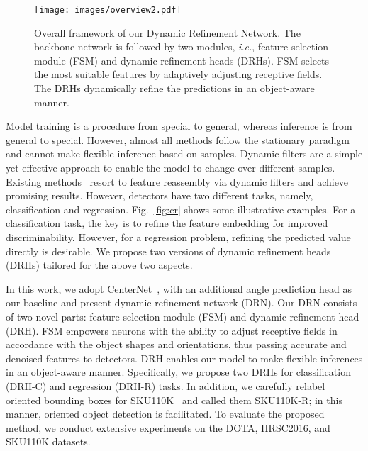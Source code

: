 \documentclass[10pt,twocolumn,letterpaper]{article}
\begin{document}
\begin{figure*}\centering
\texttt{[image: images/overview2.pdf]}
\vspace{-15pt}
\caption{Overall framework of our Dynamic Refinement Network. The backbone network is followed by two modules, \textit{i.e.}, feature selection module (FSM) and dynamic refinement heads (DRHs).
FSM selects the most suitable features by adaptively adjusting receptive fields.
The DRHs dynamically refine the predictions in an object-aware manner.}
\label{fig:overview}
\end{figure*}
 Model training is a procedure from special to general, whereas inference is from general to special.
However, almost all methods follow the stationary paradigm and cannot make flexible inference based on samples. Dynamic filters are a simple yet effective approach to enable the model to change over different samples.
Existing methods~\cite{dai2017deformable,wang2019carafe} resort to feature reassembly via dynamic filters and achieve promising results.
However, detectors have two different tasks, namely, classification and regression.
Fig.~\ref{fig:cr} shows some illustrative examples.
For a classification task, the key is to refine the feature embedding for improved discriminability.
However, for a regression problem, refining the predicted value directly is desirable.
We propose two versions of dynamic refinement heads (DRHs) tailored for the above two aspects.


In this work, we adopt CenterNet~\cite{zhou2019objects}, with an additional angle prediction head as our baseline and present dynamic refinement network (DRN).
Our DRN consists of two novel parts: feature selection module (FSM) and dynamic refinement head (DRH).
FSM empowers neurons with the ability to adjust receptive fields in accordance with the object shapes and orientations, thus passing accurate and denoised features to detectors.
DRH enables our model to make flexible inferences in an object-aware manner.
Specifically, we propose two DRHs for classification (DRH-C) and regression (DRH-R) tasks.
In addition, we carefully relabel oriented bounding boxes for SKU110K~\cite{goldman2019precise} and called them SKU110K-R; in this manner, oriented object detection is facilitated.
To evaluate the proposed method, we conduct extensive experiments on the DOTA, HRSC2016, and SKU110K datasets.
\end{document}
